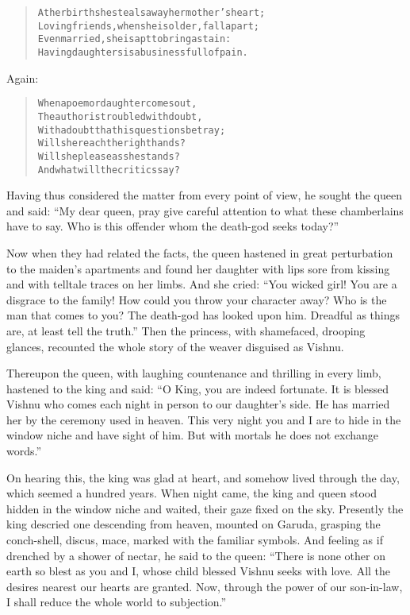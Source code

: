 \documentclass[article, twoside, 14pt]{memoir}
\renewenvironment{verbatim}{%
\begin{quote}%
\vskip -10pt%
\begin{alltt}\normalfont\large}{\end{alltt}%
\end{quote}%
\vskip -10pt
} %
\begin{document}
\begin{verbatim}
At her birth she steals away her mother's heart;
Loving friends, when she is older, fall apart;
Even married, she is apt to bring a stain:
Having daughters is a business full of pain.
\end{verbatim}
Again:

\begin{verbatim}
When a poem or daughter comes out,
The author is troubled with doubt,
    With a doubt that his questions betray;
Will she reach the right hands?
Will she please as she stands?
    And what will the critics say?
\end{verbatim}
Having thus considered the matter from every point of view, he
sought the queen and said:
``My dear queen, pray give careful attention to what these chamberlains have to say. Who is this offender whom the death-god seeks today?''

Now when they had related the facts, the queen hastened in great
perturbation to the maiden's apartments and found her daughter with
lips sore from kissing and with telltale traces on her limbs. And
she cried:
``You wicked girl! You are a disgrace to the family! How could you throw your character away? Who is the man that comes to you? The death-god has looked upon him. Dreadful as things are, at least tell the truth.''
Then the princess, with shamefaced, drooping glances, recounted the
whole story of the weaver disguised as Vishnu.

Thereupon the queen, with laughing countenance and thrilling in
every limb, hastened to the king and said:
``O King, you are indeed fortunate. It is blessed Vishnu who comes each night in person to our daughter's side. He has married her by the ceremony used in heaven. This very night you and I are to hide in the window niche and have sight of him. But with mortals he does not exchange words.''

On hearing this, the king was glad at heart, and somehow lived
through the day, which seemed a hundred years. When night came, the
king and queen stood hidden in the window niche and waited, their
gaze fixed on the sky. Presently the king descried one descending
from heaven, mounted on Garuda, grasping the conch-shell, discus,
mace, marked with the familiar symbols. And feeling as if drenched
by a shower of nectar, he said to the queen:
``There is none other on earth so blest as you and I, whose child blessed Vishnu seeks with love. All the desires nearest our hearts are granted. Now, through the power of our son-in-law, I shall reduce the whole world to subjection.''
\end{document}

